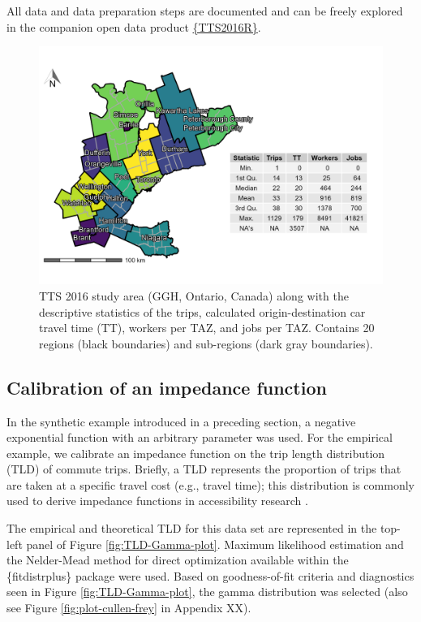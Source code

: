\documentclass[]{elsarticle} %
\begin{document}
All data and data preparation steps are documented and can be freely
explored in the companion open data product
\href{https://github.com/soukhova/TTS2016R}{\{TTS2016R\}}.

\begin{figure}

{\centering \includegraphics[width=0.8\linewidth]{images/TTS16-survey-area} 

}

\caption{\label{fig:TTS-16-survey-area}TTS 2016 study area (GGH, Ontario, Canada) along with the descriptive statistics of the trips, calculated origin-destination car travel time (TT), workers per TAZ, and jobs per TAZ. Contains 20 regions (black boundaries) and sub-regions (dark gray boundaries).}\label{fig:TTS-16-survey-area}
\end{figure}

\hypertarget{calibration-of-an-impedance-function}{%
\subsection{Calibration of an impedance
function}\label{calibration-of-an-impedance-function}}

In the synthetic example introduced in a preceding section, a negative
exponential function with an arbitrary parameter was used. For the
empirical example, we calibrate an impedance function on the trip length
distribution (TLD) of commute trips. Briefly, a TLD represents the
proportion of trips that are taken at a specific travel cost (e.g.,
travel time); this distribution is commonly used to derive impedance
functions in accessibility research
\citep{horbachov_theoretical_2018, batista_estimation_2019}.

The empirical and theoretical TLD for this data set are represented in
the top-left panel of Figure \ref{fig:TLD-Gamma-plot}. Maximum
likelihood estimation and the Nelder-Mead method for direct optimization
available within the \{fitdistrplus\} package \citep{fitdistrplus_2015}
were used. Based on goodness-of-fit criteria and diagnostics seen in
Figure \ref{fig:TLD-Gamma-plot}, the gamma distribution was selected
(also see Figure \ref{fig:plot-cullen-frey} in Appendix XX).
\end{document}

